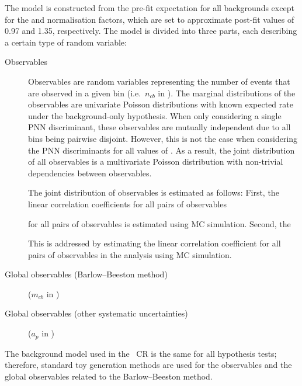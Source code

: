 The model is constructed from the pre-fit expectation for all backgrounds except
for the \ttbar and \ZHF normalisation factors, which are set to approximate
post-fit values of 0.97 and 1.35, respectively. The model is divided into three
parts, each describing a certain type of random variable:
\begin{description}

\item[Observables] Observables are random variables representing the number of
  events that are observed in a given bin (i.e.~$n_{cb}$ in
  ). The marginal distributions of the
  observables are univariate Poisson distributions with known expected rate
  under the background-only hypothesis. When only considering a single PNN
  discriminant, these observables are mutually independent due to all bins being
  pairwise disjoint. However, this is not the case when considering the PNN
  discriminants for all values of \mX. As a result, the joint distribution of
  all observables is a multivariate Poisson distribution with non-trivial
  dependencies between observables.

  The joint distribution of observables is estimated as follows: First, the
  linear correlation coefficients for all pairs of observables

  for all pairs of observables is estimated using
  MC simulation. Second, the




  This is addressed by estimating the linear correlation coefficient for all
  pairs of observables in the analysis using MC simulation.








\item[Global observables (Barlow--Beeston method)] ($m_{cb}$ in
  )

\item[Global observables (other systematic uncertainties)] ($a_p$ in
  )

\end{description}
The background model used in the \ZHF~CR is the same for all hypothesis tests;
therefore, standard toy generation methods are used for the observables and the
global observables related to the Barlow--Beeston method.

